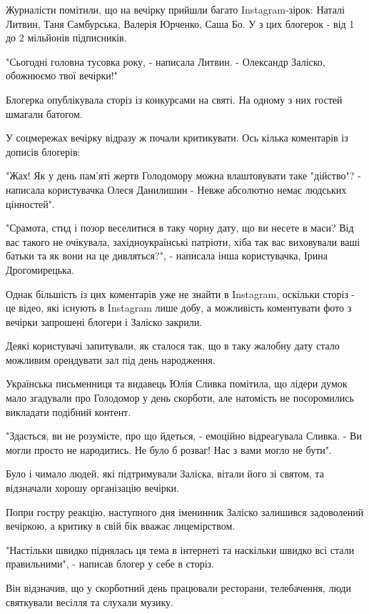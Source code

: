 \begin{multicols}{2}
Журналісти помітили, що на вечірку прийшли багато Instagram-зірок: Наталі
Литвин, Таня Самбурська, Валерія Юрченко, Саша Бо. У з цих блогерок - від 1 до
2 мільйонів підписників.

"Сьогодні головна тусовка року, - написала Литвин. - Олександр Заліско,
обожнюємо твої вечірки!"

Блогерка опублікувала сторіз із конкурсами на святі. На одному з них гостей
шмагали батогом.


У соцмережах вечірку відразу ж почали критикувати. Ось кілька коментарів із
дописів блогерів:

"Жах! Як у день пам'яті жертв Голодомору можна влаштовувати таке "дійство"? -
написала користувачка Олеся Данилишин - Невже абсолютно немає людських
цінностей".

"Срамота, стид і позор веселитися в таку чорну дату, що ви несете в маси? Від
вас такого не очікувала, західноукраїнські патріоти, хіба так вас виховували
ваші батьки та як вони на це дивляться?", - написала інша користувачка, Ірина
Дрогомирецька.

Однак більшість із цих коментарів уже не знайти в Instagram, оскільки сторіз -
це відео, які існують в Instagram лише добу, а можливість коментувати фото з
вечірки запрошені блогери і Заліско закрили.

Деякі користувачі запитували, як сталося так, що в таку жалобну дату стало
можливим орендувати зал під день народження.

Українська письменниця та видавець Юлія Сливка помітила, що лідери думок мало
згадували про Голодомор у день скорботи, але натомість не посоромились
викладати подібний контент.

"Здається, ви не розумієте, про що йдеться, - емоційно відреагувала Сливка. -
Ви могли просто не народитись. Не було б розваг! Нас з вами могло не бути".

Було і чимало людей, які підтримували Заліска, вітали його зі святом, та
відзначали хорошу організацію вечірки.


Попри гостру реакцію, наступного дня іменинник Заліско залишився задоволений
вечіркою, а критику в свій бік вважає лицемірством.

"Настільки швидко піднялась ця тема в інтернеті та наскільки швидко всі стали
правильними", - написав блогер у себе в сторіз.

Він відзначив, що у скорботний день працювали ресторани, телебачення, люди
святкували весілля та слухали музику.


\end{multicols}
